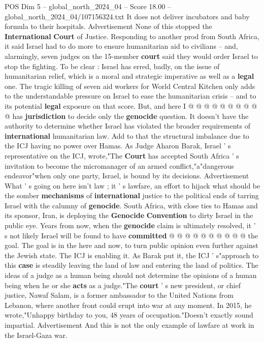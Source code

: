\begin{textsample}{POS Dim 5 – global\_north\_2024\_04 – Score 18.00 – global\_north\_2024\_04/107156324.txt}
It does not deliver incubators and baby formula to their hospitals.
Advertisement None of this stopped the \textbf{International} \textbf{Court} of Justice.
Responding to another prod from South Africa, it said Israel had to do more to ensure humanitarian aid to civilians -- and, alarmingly, seven judges on the 15-member \textbf{court} said they would order Israel to stop the fighting.
To be clear : Israel has erred, badly, on the issue of humanitarian relief, which is a moral and strategic imperative as well as a \textbf{legal} one.
The tragic killing of seven aid workers for World Central Kitchen only adds to the understandable pressure on Israel to ease the humanitarian crisis -- and to its potential \textbf{legal} exposure on that score.
But, and here I @ @ @ @ @ @ @ @ @ @ has \textbf{jurisdiction} to decide only the \textbf{genocide} question.
It doesn't have the authority to determine whether Israel has violated the broader requirements of \textbf{international} humanitarian law.
Add to that the structural imbalance due to the ICJ having no power over Hamas.
As Judge Aharon Barak, Israel ' s representative on the ICJ, wrote,"The \textbf{Court} has accepted South Africa ' s invitation to become the micromanager of an armed conflict,"a"dangerous endeavor"when only one party, Israel, is bound by its decisions.
Advertisement What ' s going on here isn't law ; it ' s lawfare, an effort to hijack what should be the somber \textbf{mechanisms} of \textbf{international} justice to the political ends of tarring Israel with the calumny of \textbf{genocide}.
South Africa, with close ties to Hamas and its sponsor, Iran, is deploying the \textbf{Genocide} \textbf{Convention} to dirty Israel in the public eye.
Years from now, when the \textbf{genocide} claim is ultimately resolved, it ' s not likely Israel will be found to have \textbf{committed} @ @ @ @ @ @ @ @ @ @ the goal.
The goal is in the here and now, to turn public opinion even further against the Jewish state.
The ICJ is enabling it.
As Barak put it, the ICJ ' s"approach to this \textbf{case} is steadily leaving the land of law and entering the land of politics.
The ideas of a judge as a human being should not determine the opinions of a human being when he or she \textbf{acts} as a judge."The \textbf{court} ' s new president, or chief justice, Nawaf Salam, is a former ambassador to the United Nations from Lebanon, where another front could erupt into war at any moment.
In 2015, he wrote,"Unhappy birthday to you, 48 years of occupation."Doesn't exactly sound impartial.
Advertisement And this is not the only example of lawfare at work in the Israel-Gaza war.

\end{textsample}
